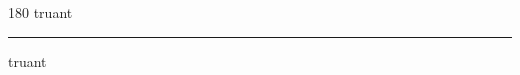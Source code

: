 
\begin{frame}
\begin{center}
\begin{turn}{180}
{\fontsize{2.5cm}{1em}\selectfont truant}
\end{turn}
\vspace{1em}\par  
\hrule
\vspace{1em}\par  
{\fontsize{2.5cm}{1em}\selectfont truant}
\end{center}
\end{frame}
